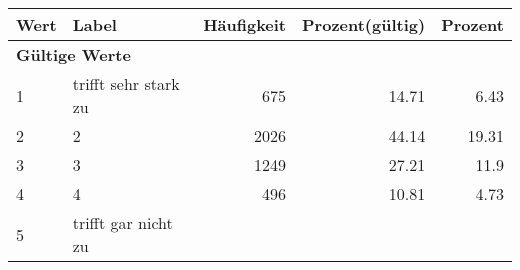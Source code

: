      \begin{longtable}{lXrrr}
     \toprule
     \textbf{Wert} & \textbf{Label} & \textbf{Häufigkeit} & \textbf{Prozent(gültig)} & \textbf{Prozent} \\
     \endhead
     \midrule
     \multicolumn{5}{l}{\textbf{Gültige Werte}}\\

     1 &
     \multicolumn{1}{X}{ trifft sehr stark zu   } &


       \num{675} &
       \num[round-mode=places,round-precision=2]{14,71} &
         \num[round-mode=places,round-precision=2]{6,43} \\

     2 &
     \multicolumn{1}{X}{ 2   } &


       \num{2026} &
       \num[round-mode=places,round-precision=2]{44,14} &
         \num[round-mode=places,round-precision=2]{19,31} \\

     3 &
     \multicolumn{1}{X}{ 3   } &


       \num{1249} &
       \num[round-mode=places,round-precision=2]{27,21} &
         \num[round-mode=places,round-precision=2]{11,9} \\

     4 &
     \multicolumn{1}{X}{ 4   } &


       \num{496} &
       \num[round-mode=places,round-precision=2]{10,81} &
         \num[round-mode=places,round-precision=2]{4,73} \\

     5 &
     \multicolumn{1}{X}{ trifft gar nicht zu   } &



\end{longtable}
